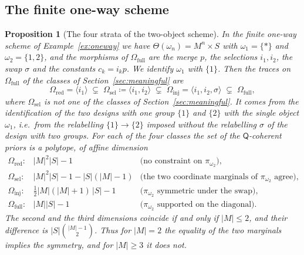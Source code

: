 \documentclass[11pt,a4paper]{article}
\theoremstyle{plain}
\newtheorem{proposition}[theorem]{Proposition}
\theoremstyle{definition}
\theoremstyle{remark}
\newcommand{\cat}[1]{\mathsf{#1}}
\newcommand{\catO}{\cat{\Omega}}
\begin{document}
\subsection{The finite one-way scheme}

\begin{proposition}[The four strata of the two-object scheme]\label{prop:priordim}
In the finite one-way scheme of Example~\ref{ex:oneway} we have
$\Theta(\omega_n) = M^{n}\times S$ with $\omega_1 = \{*\}$ and
$\omega_2 = \{1,2\}$, and the morphisms of $\catO_{\mathrm{full}}$ are the
merge $p$, the selections $i_1,i_2$, the swap $\sigma$ and the constants
$c_k = i_k p$. We identify $\omega_1$ with $\{1\}$. Then the traces on
$\catO_{\mathrm{full}}$ of the classes of Section~\ref{sec:meaningful} are
\[
\catO_{\mathrm{red}} = \langle i_1\rangle \;\subsetneq\;
\catO_{\mathrm{sel}} \coloneqq \langle i_1,i_2\rangle \;\subsetneq\;
\catO_{\mathrm{inj}} = \langle i_1,i_2,\sigma\rangle \;\subsetneq\;
\catO_{\mathrm{full}} ,
\]
where $\catO_{\mathrm{sel}}$ is not one of the classes of
Section~\ref{sec:meaningful}. It comes from the identification of the two
designs with one group $\{1\}$ and $\{2\}$ with the single object $\omega_1$,
i.e.\ from the relabelling $\{1\} \to \{2\}$ imposed without the relabelling
$\sigma$ of the design with two groups. For each of the four classes the set of
the $\cat{Q}$-coherent priors is a polytope, of affine dimension
\[
\begin{array}{lll}
\catO_{\mathrm{red}}:  & |M|^{2}|S| - 1 & \text{(no constraint on $\pi_{\omega_2}$)},\\[2pt]
\catO_{\mathrm{sel}}:  & |M|^{2}|S| - 1 - |S|(|M|-1) & \text{(the two coordinate marginals of $\pi_{\omega_2}$ agree)},\\[2pt]
\catO_{\mathrm{inj}}:  & \tfrac12 |M|(|M|+1)\,|S| - 1 & \text{($\pi_{\omega_2}$ symmetric under the swap)},\\[2pt]
\catO_{\mathrm{full}}: & |M||S| - 1 & \text{($\pi_{\omega_2}$ supported on the diagonal)}.
\end{array}
\]
The second and the third dimensions coincide if and only if $|M| \le 2$, and
their difference is $|S|\binom{|M|-1}{2}$. Thus for $|M| = 2$ the equality of
the two marginals implies the symmetry, and for $|M| \ge 3$ it does not.
\end{proposition}
\end{document}
